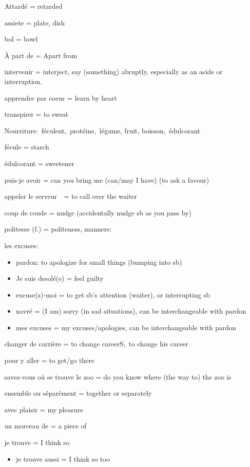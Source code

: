 Attardé = retarded~

assiete = plate, dish

bol = bowl

À part de = Apart from

intervenir = interject, say (something) abruptly, especially as an aside
or interruption.

apprendre par coeur = learn by heart

transpirer = to sweat

Nourriture:~féculent,~protéine,~légume, fruit, boisson,~édulcorant

fécule = starch

édulcorant = sweetener

puis-je avoir = can you bring me (can/may I have) (to ask a favour)

appeler le serveur~~= to call over the waiter

coup de coude = nudge (accidentally nudge sb as you pass by)

politesse (f.) = politeness, manners:

les excuses:

\begin{itemize}
\item
  pardon: to apologize for small things (bumping into sb)
\item
  Je suis desolé(e) = feel guilty
\item
  excuse(z)-moi = to get sb's attention (waiter), or interrupting sb
\item
  navré = (I am) sorry (in sad situations), can be interchangeable with
  pardon
\item
  mes excuses = my excuses/apologies, can be interchangeable with pardon
\end{itemize}

changer de {carrière} = to change {careerS},~to change his {career~}

pour y aller = to get/go there

savez-vous où se trouve le zoo = do you know where (the way to) the zoo
is

ensemble ou séparément = together or separately

avec plaisir = my pleasure

un morceau de = a piece of

je trouve = I think so

\begin{itemize}
\item
  je trouve aussi = I think so too
\end{itemize}

